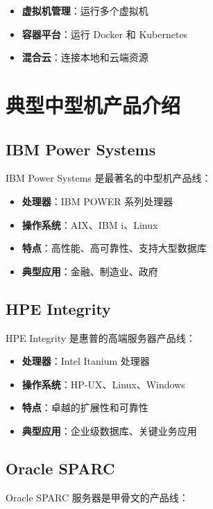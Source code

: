 \documentclass[12pt,UTF8]{ctexbook}
\begin{document}
\begin{itemize}[leftmargin=2cm]
    \item \textbf{虚拟机管理}：运行多个虚拟机
    \item \textbf{容器平台}：运行 Docker 和 Kubernetes
    \item \textbf{混合云}：连接本地和云端资源
\end{itemize}

\chapter{典型中型机产品介绍}
\label{chap:products}

\section{IBM Power Systems}

IBM Power Systems 是最著名的中型机产品线：

\begin{itemize}[leftmargin=2cm]
    \item \textbf{处理器}：IBM POWER 系列处理器
    \item \textbf{操作系统}：AIX、IBM i、Linux
    \item \textbf{特点}：高性能、高可靠性、支持大型数据库
    \item \textbf{典型应用}：金融、制造业、政府
\end{itemize}

\section{HPE Integrity}

HPE Integrity 是惠普的高端服务器产品线：

\begin{itemize}[leftmargin=2cm]
    \item \textbf{处理器}：Intel Itanium 处理器
    \item \textbf{操作系统}：HP-UX、Linux、Windows
    \item \textbf{特点}：卓越的扩展性和可靠性
    \item \textbf{典型应用}：企业级数据库、关键业务应用
\end{itemize}

\section{Oracle SPARC}

Oracle SPARC 服务器是甲骨文的产品线：
\end{document}

